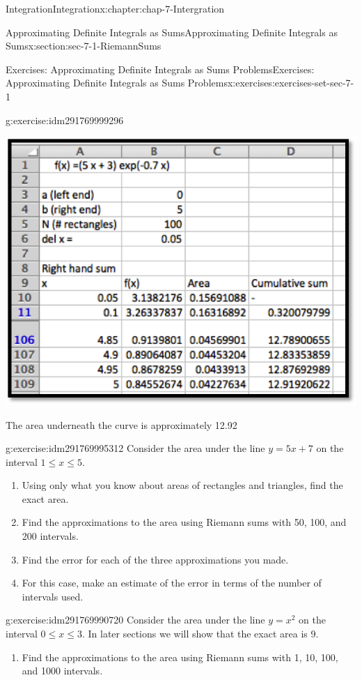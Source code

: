 \documentclass[oneside,10pt,]{book}
\numberwithin{equation}{section}
\begin{document}
\begin{chapterptx}{Integration}{}{Integration}{}{}{x:chapter:chap-7-Intergration}
\begin{sectionptx}{Approximating Definite Integrals as Sums}{}{Approximating Definite Integrals as Sums}{}{}{x:section:sec-7-1-RiemannSums}
\begin{exercises-subsection}{Exercises: Approximating Definite Integrals as Sums Problems}{}{Exercises: Approximating Definite Integrals as Sums Problems}{}{}{x:exercises:exercises-set-sec-7-1}
\begin{divisionexercise}{7}{}{}{g:exercise:idm291769999296}
\begin{sidebyside}{1}{0.2}{0.2}{0}
\begin{sbspanel}{0.6}%
\includegraphics[width=\linewidth]{images/sec7-1-sol7a.png}
\end{sbspanel}%
\end{sidebyside}%
\par
The area underneath the curve is approximately 12.92%
\end{divisionexercise}%
\begin{divisionexercise}{8}{}{}{g:exercise:idm291769995312}%
Consider the area under the line \(y = 5 x + 7\) on the interval \(1 \le  x \le  5\).%
%
\begin{enumerate}[label=(\alph*)]
\item{}Using only what you know about areas of rectangles and triangles, find the exact area.%
\item{}Find the approximations to the area using Riemann sums with 50, 100, and 200 intervals.%
\item{}Find the error for each of the three approximations you made.%
\item{}For this case, make an estimate of the error in terms of the number of intervals used.%
\end{enumerate}
\end{divisionexercise}%
\begin{divisionexercise}{9}{}{}{g:exercise:idm291769990720}%
Consider the area under the line \(y = x^2\) on the interval \(0 \le  x \le  3\).  In later sections we will show that the exact area is 9.%
%
\begin{enumerate}[label=(\alph*)]
\item{}Find the approximations to the area using Riemann sums with 1, 10, 100, and 1000 intervals.%

\end{enumerate}
\end{divisionexercise}
\end{exercises-subsection}
\end{sectionptx}
\end{chapterptx}
\end{document}
